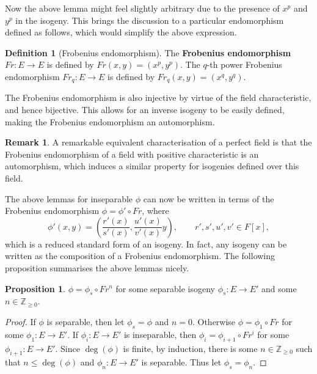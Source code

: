 \documentclass{article}
\newcommand{\Z}{\mathbb{Z}}
\newcommand{\rb}[1]{\left( #1 \right)}
\renewcommand{\sb}[1]{\left[ #1 \right]}
\theoremstyle{definition}\newtheorem*{definition}{Definition}
\theoremstyle{definition}\newtheorem*{example}{Example}
\theoremstyle{definition}\newtheorem*{remark}{Remark}
\newtheorem{proposition}{Proposition}[subsection]
\begin{document}
Now the above lemma might feel slightly arbitrary due to the presence of $ x^p $ and $ y^p $ in the isogeny. This brings the discussion to a particular endomorphism defined as follows, which would simplify the above expression.

\begin{definition}[Frobenius endomorphism]
The \textbf{Frobenius endomorphism} $ Fr : E \to E $ is defined by $ Fr\rb{x, y} = \rb{x^p, y^p} $. The $ q $-th power Frobenius endomorphism $ Fr_q : E \to E $ is defined by $ Fr_q\rb{x, y} = \rb{x^q, y^q} $.
\end{definition}

The Frobenius endomorphism is also injective by virtue of the field characteristic, and hence bijective. This allows for an inverse isogeny to be easily defined, making the Frobenius endomorphism an automorphism.

\begin{remark}
A remarkable equivalent characterisation of a perfect field is that the Frobenius endomorphism of a field with positive characteristic is an automorphism, which induces a similar property for isogenies defined over this field.
\end{remark}

The above lemmas for inseparable $ \phi $ can now be written in terms of the Frobenius endomorphism $ \phi = \phi' \circ Fr $, where
$$ \phi'\rb{x, y} = \rb{\dfrac{r'\rb{x}}{s'\rb{x}}, \dfrac{u'\rb{x}}{v'\rb{x}}y}, \qquad r', s', u', v' \in F\sb{x}, $$
which is a reduced standard form of an isogeny. In fact, any isogeny can be written as the composition of a Frobenius endomorphism. The following proposition summarises the above lemmas nicely.

\begin{proposition}
$ \phi = \phi_s \circ Fr^n $ for some separable isogeny $ \phi_s : E \to E' $ and some $ n \in \Z_{\ge 0} $.
\end{proposition}

\begin{proof}
If $ \phi $ is separable, then let $ \phi_s = \phi $ and $ n = 0 $. Otherwise $ \phi = \phi_1 \circ Fr $ for some $ \phi_1 : E \to E' $. If $ \phi_i : E \to E' $ is inseparable, then $ \phi_i = \phi_{i + 1} \circ Fr^i $ for some $ \phi_{i + 1} : E \to E' $. Since $ \deg\rb{\phi} $ is finite, by induction, there is some $ n \in \Z_{\ge 0} $ such that $ n \le \deg\rb{\phi} $ and $ \phi_n : E \to E' $ is separable. Thus let $ \phi_s = \phi_n $.
\end{proof}
\end{document}

